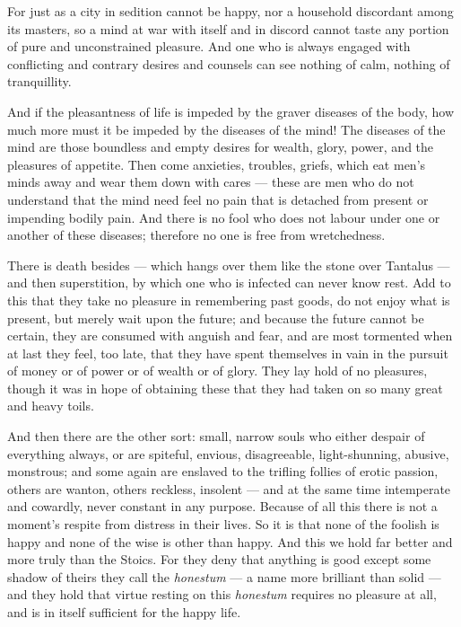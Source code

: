  For just as a city in sedition cannot be happy, nor a household discordant among its masters, so a mind at war with itself and in discord cannot taste any portion of pure and unconstrained pleasure. And one who is always engaged with conflicting and contrary desires and counsels can see nothing of calm, nothing of tranquillity.

 And if the pleasantness of life is impeded by the graver diseases of the body, how much more must it be impeded by the diseases of the mind! The diseases of the mind are those boundless and empty desires for wealth, glory, power, and the pleasures of appetite. Then come anxieties, troubles, griefs, which eat men's minds away and wear them down with cares — these are men who do not understand that the mind need feel no pain that is detached from present or impending bodily pain. And there is no fool who does not labour under one or another of these diseases; therefore no one is free from wretchedness.

 There is death besides — which hangs over them like the stone over Tantalus — and then superstition, by which one who is infected can never know rest. Add to this that they take no pleasure in remembering past goods, do not enjoy what is present, but merely wait upon the future; and because the future cannot be certain, they are consumed with anguish and fear, and are most tormented when at last they feel, too late, that they have spent themselves in vain in the pursuit of money or of power or of wealth or of glory. They lay hold of no pleasures, though it was in hope of obtaining these that they had taken on so many great and heavy toils.

 And then there are the other sort: small, narrow souls who either despair of everything always, or are spiteful, envious, disagreeable, light-shunning, abusive, monstrous; and some again are enslaved to the trifling follies of erotic passion, others are wanton, others reckless, insolent — and at the same time intemperate and cowardly, never constant in any purpose. Because of all this there is not a moment's respite from distress in their lives. So it is that none of the foolish is happy and none of the wise is other than happy. And this we hold far better and more truly than the Stoics. For they deny that anything is good except some shadow of theirs they call the \textit{honestum} — a name more brilliant than solid — and they hold that virtue resting on this \textit{honestum} requires no pleasure at all, and is in itself sufficient for the happy life.

